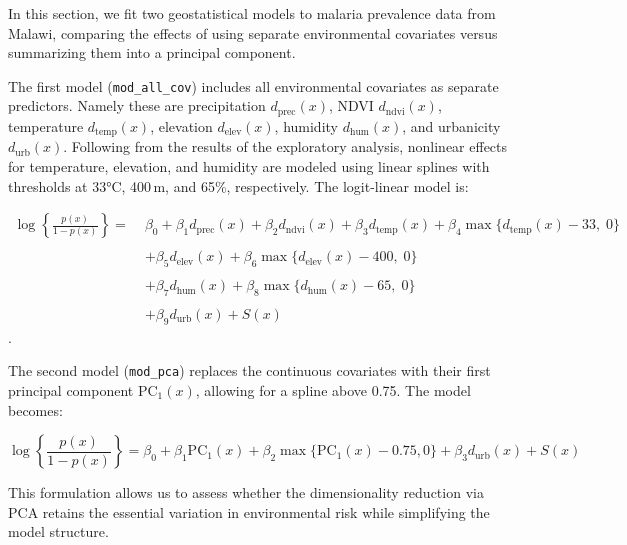 \documentclass[
  letterpaper,
]{krantz}
\begin{document}
In this section, we fit two geostatistical models to malaria prevalence
data from Malawi, comparing the effects of using separate environmental
covariates versus summarizing them into a principal component.

The first model (\texttt{mod\_all\_cov}) includes all environmental
covariates as separate predictors. Namely these are precipitation
\(d_{\text{prec}}(x)\), NDVI \(d_{\text{ndvi}}(x)\), temperature
\(d_{\text{temp}}(x)\), elevation \(d_{\text{elev}}(x)\), humidity
\(d_{\text{hum}}(x)\), and urbanicity \(d_{\text{urb}}(x)\). Following
from the results of the exploratory analysis, nonlinear effects for
temperature, elevation, and humidity are modeled using linear splines
with thresholds at 33°C, 400\,m, and 65\%, respectively. The
logit-linear model is:

\[
\begin{aligned}
\log\left\{\frac{p(x)}{1 - p(x)}\right\} =\; & 
\beta_0 + 
\beta_1 d_{\text{prec}}(x) +
\beta_2 d_{\text{ndvi}}(x) +
\beta_3 d_{\text{temp}}(x) + \beta_4 \max\{d_{\text{temp}}(x) - 33,\; 0\} \\\\
& +
\beta_5 d_{\text{elev}}(x) + \beta_6 \max\{d_{\text{elev}}(x) - 400,\; 0\} \\\\
& +
\beta_7 d_{\text{hum}}(x) + \beta_8 \max\{d_{\text{hum}}(x) - 65,\; 0\} \\\\
& +
\beta_9 d_{\text{urb}}(x) + S(x)
\end{aligned}
\].

The second model (\texttt{mod\_pca}) replaces the continuous covariates
with their first principal component \(\text{PC}_1(x)\), allowing for a
spline above 0.75. The model becomes:

\[
\log\left\{\frac{p(x)}{1-p(x)}\right\} = \beta_0 + 
\beta_1 \text{PC}_1(x) + 
\beta_2 \max\{\text{PC}_1(x) - 0.75,0\} +
\beta_3 d_{\text{urb}}(x) + S(x)
\]

This formulation allows us to assess whether the dimensionality
reduction via PCA retains the essential variation in environmental risk
while simplifying the model structure.
\end{document}
